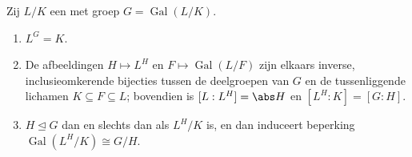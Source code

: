 \begin{theorem}
\label{thm:b3:galois:fundamental}
Zij $L/K$ een  met groep $G =
\operatorname{Gal}(L/K)$.
\begin{enumerate}
  \item $L^G = K$.
  \item De afbeeldingen $H \mapsto L^H$ en $F \mapsto
        \operatorname{Gal}(L/F)$ zijn elkaars inverse,
        inclusieomkerende bijecties tussen de deelgroepen van $G$
        en de tussenliggende lichamen $K \subseteq F \subseteq L$;
        bovendien is $[L : L^H] = \abs H$ en $[L^H : K] = [G :
        H]$.
  \item $H \trianglelefteq G$ dan en slechts dan als $L^H/K$
         is, en dan induceert beperking $\operatorname{Gal}
        (L^H/K) \cong G/H$.
\end{enumerate}
\end{theorem}


